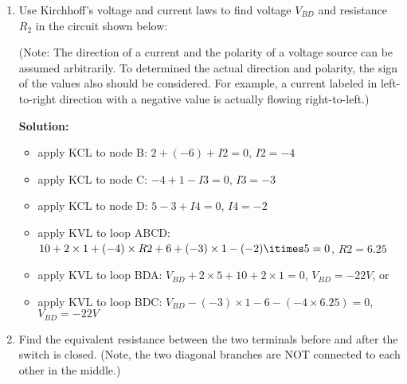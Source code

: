 \begin{enumerate}
\item Use Kirchhoff's voltage and current laws to find voltage $V_{BD}$ and resistance 
$R_2$ in the circuit shown below:


(Note: The direction of a current and the polarity of a voltage source can
be assumed arbitrarily. To determined the actual direction and polarity, the
sign of the values also should be considered. For example, a current labeled 
in left-to-right direction with a negative value is actually flowing 
right-to-left.)

{\bf Solution:}
\begin{itemize}
\item apply KCL to node B: $2+(-6)+I2=0$, $I2=-4$ 
\item apply KCL to node C: $-4+1-I3=0$, $I3=-3$
\item apply KCL to node D: $5-3+I4=0$, $I4=-2$
\item apply KVL to loop ABCD: 
	$10+2\times 1+(-4)\times R2+6+(-3)\times 1-(-2)\itimes 5=0$, 
	$R2=6.25$
\item apply KVL to loop BDA: $V_{BD}+2\times 5+10+2\times 1=0$, 
	$V_{BD}=-22V$, or
\item apply KVL to loop BDC: $V_{BD}-(-3)\times 1-6-(-4\times 6.25)=0$, 
	$V_{BD}=-22V$
\end{itemize}





\item Find the equivalent resistance between the two terminals before and
after the switch is closed. (Note, the two diagonal branches are NOT
connected to each other in the middle.)


\end{enumerate}
